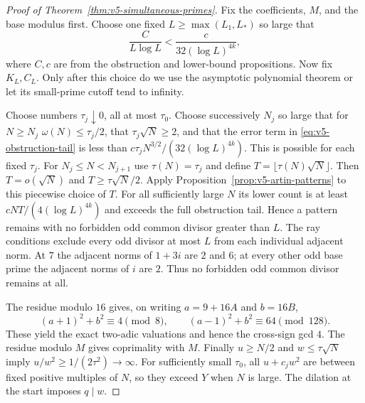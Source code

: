 \begin{proof}[Proof of Theorem~\ref{thm:v5-simultaneous-primes}]
Fix the coefficients, $M$, and the base modulus first. Choose one fixed
$L\geq\max(L_1,L_*)$ so large that
\[
 \frac C{L\log L}<\frac c{32(\log L)^{4k}},
\]
where $C,c$ are from the obstruction and lower-bound propositions.
Now fix $K_L,C_L$. Only after this choice do we use the asymptotic
polynomial theorem or let its small-prime cutoff tend to infinity.

Choose numbers $\tau_j\downarrow0$, all at most $\tau_0$.
Choose successively $N_j$ so large that for $N\geq N_j$
$\omega(N)\leq\tau_j/2$,
that $\tau_j\sqrt N\geq2$, and that the error term in
\eqref{eq:v5-obstruction-tail} is less than
$c\tau_jN^{3/2}/(32(\log L)^{4k})$.
This is possible for each fixed $\tau_j$.
For $N_j\leq N<N_{j+1}$ use $\tau(N)=\tau_j$ and define
$T=\lfloor\tau(N)\sqrt N\rfloor$.
Then $T=o(\sqrt N)$ and $T\geq\tau\sqrt N/2$.
Apply Proposition~\ref{prop:v5-artin-patterns} to this piecewise choice
of $T$. For all sufficiently large $N$ its lower count is at least
$cNT/(4(\log L)^{4k})$ and exceeds the full obstruction tail.
Hence a pattern remains with no forbidden odd
common divisor greater than $L$.
The ray conditions exclude every odd divisor at most $L$ from each
individual adjacent norm. At $7$ the adjacent norms of $1+3i$ are $2$
and $6$; at every other odd base prime the adjacent norms of $i$ are $2$.
Thus no forbidden odd common divisor remains at all.

The residue modulo $16$ gives, on writing $a=9+16A$ and $b=16B$,
\[
 (a+1)^2+b^2\equiv4\pmod8,\qquad
 (a-1)^2+b^2\equiv64\pmod{128}.
\]
These yield the exact two-adic valuations and hence the cross-sign gcd
$4$. The residue modulo $M$ gives coprimality with $M$.
Finally $u\geq N/2$ and $w\leq\tau\sqrt N$ imply
$u/w^2\geq1/(2\tau^2)\to\infty$.
For sufficiently small $\tau_0$, all $u+c_jw^2$ are between fixed positive
multiples of $N$, so they exceed $Y$ when $N$ is large.
The dilation at the start imposes $q\mid w$.
\end{proof}
